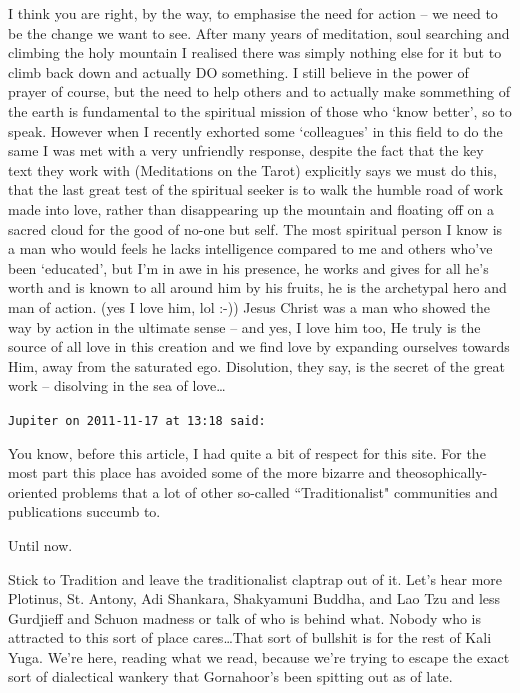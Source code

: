 \begin{footnotesize}
\begin{sffamily}
I think you are right, by the way, to emphasise the need for action – we need to be the change we want to see. After many years of meditation, soul searching and climbing the holy mountain I realised there was simply nothing else for it but to climb back down and actually DO something. I still believe in the power of prayer of course, but the need to help others and to actually make sommething of the earth is fundamental to the spiritual mission of those who `know better', so to speak. However when I recently exhorted some `colleagues' in this field to do the same I was met with a very unfriendly response, despite the fact that the key text they work with (Meditations on the Tarot) explicitly says we must do this, that the last great test of the spiritual seeker is to walk the humble road of work made into love, rather than disappearing up the mountain and floating off on a sacred cloud for the good of no-one but self. The most spiritual person I know is a man who would feels he lacks intelligence compared to me and others who've been `educated', but I'm in awe in his presence, he works and gives for all he's worth and is known to all around him by his fruits, he is the archetypal hero and man of action. (yes I love him, lol :-)) Jesus Christ was a man who showed the way by action in the ultimate sense – and yes, I love him too, He truly is the source of all love in this creation and we find love by expanding ourselves towards Him, away from the saturated ego. Disolution, they say, is the secret of the great work – disolving in the sea of love…


\hfill

\texttt{Jupiter on 2011-11-17 at 13:18 said: }

You know, before this article, I had quite a bit of respect for this site. For the most part this place has avoided some of the more bizarre and theosophically-oriented problems that a lot of other so-called ``Traditionalist" communities and publications succumb to.

Until now.

Stick to Tradition and leave the traditionalist claptrap out of it. Let's hear more Plotinus, St. Antony, Adi Shankara, Shakyamuni Buddha, and Lao Tzu and less Gurdjieff and Schuon madness or talk of who is behind what. Nobody who is attracted to this sort of place cares…That sort of bullshit is for the rest of Kali Yuga. We're here, reading what we read, because we're trying to escape the exact sort of dialectical wankery that Gornahoor's been spitting out as of late.



\end{sffamily}
\end{footnotesize}
